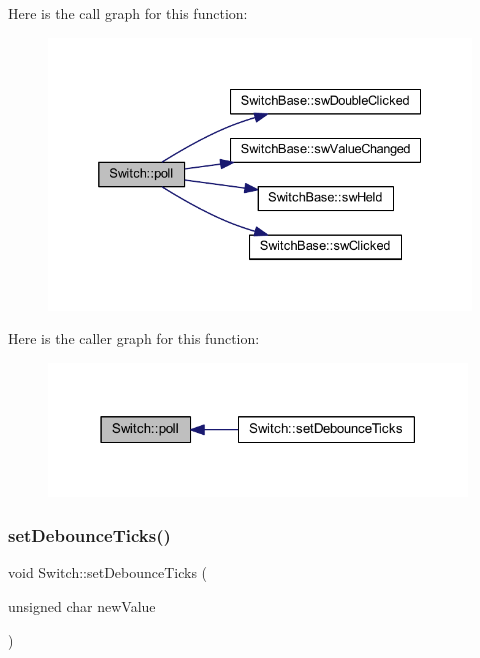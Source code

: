 Here is the call graph for this function\+:
\nopagebreak
\begin{figure}[H]
\begin{center}
\leavevmode
\includegraphics[width=332pt]{class_switch_a5401c79fd9fda679eae5e4bba5578a35_cgraph}
\end{center}
\end{figure}
Here is the caller graph for this function\+:
\nopagebreak
\begin{figure}[H]
\begin{center}
\leavevmode
\includegraphics[width=315pt]{class_switch_a5401c79fd9fda679eae5e4bba5578a35_icgraph}
\end{center}
\end{figure}
\mbox{\label{class_switch_ad1991a92a3b5c470d667a5e26c59ef59}} 
\subsubsection{\texorpdfstring{set\+Debounce\+Ticks()}{setDebounceTicks()}}
{\footnotesize\ttfamily void Switch\+::set\+Debounce\+Ticks (\begin{DoxyParamCaption}\item[{unsigned char}]{new\+Value }\end{DoxyParamCaption})\hspace{0.3cm}{\ttfamily [inline]}}



